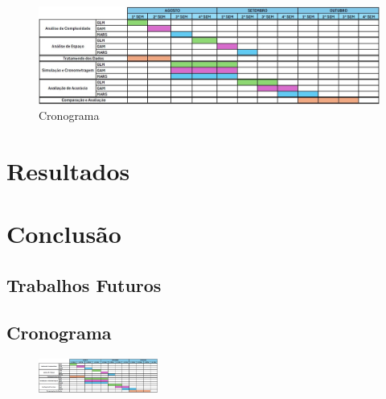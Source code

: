 \documentclass[
    12pt,               %
    openright,          %
    oneside,            %
    a4paper,            %
    english,            %
    brazil              %
    ]{abntex2}
\begin{document}
\begin{figure}[H]
    \centering
    \caption{\label{Cronograma}Cronograma}
    \includegraphics[width=1\textwidth]{../imgs/Cronograma.jpg}
\end{figure}

 \chapter{Resultados}
 
\chapter{Conclusão}
\section{Trabalhos Futuros}

\postextual



\begin{apendicesenv}

\partapendices

\chapter{\label{AnexoA} Cronograma}
\begin{figure}[h]
    \centering
    \includegraphics[angle=90, width=0.35\textwidth]{../imgs/Cronograma.jpg}
\end{figure}

\end{apendicesenv}
\end{document}
